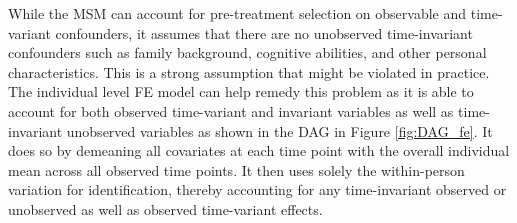 While the \ac{MSM} can account for pre-treatment selection on observable and time-variant confounders, it assumes that there are no unobserved time-invariant confounders such as family background, cognitive abilities, and other personal characteristics. This is a strong assumption that might be violated in practice. The individual level \ac{FE} model can help remedy this problem as it is able to account for both observed time-variant and invariant variables as well as time-invariant unobserved variables as shown in the \ac{DAG} in Figure \ref{fig:DAG_fe}. It does so by demeaning all covariates at each time point with the overall individual mean across all observed time points. It then uses solely the within-person variation for identification, thereby accounting for any time-invariant observed or unobserved as well as observed time-variant effects. 


